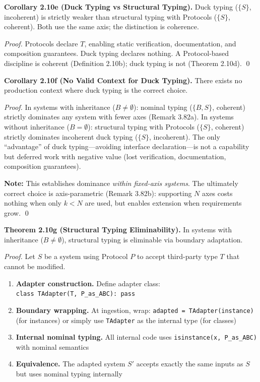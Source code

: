 \textbf{Corollary 2.10e (Duck Typing vs Structural Typing).} Duck typing
(\(\{S\}\), incoherent) is strictly weaker than structural typing with
Protocols (\(\{S\}\), coherent). Both use the same axis; the distinction is coherence.

\emph{Proof.} Protocols declare \(T\), enabling static verification,
documentation, and composition guarantees. Duck typing declares nothing.
A Protocol-based discipline is coherent (Definition 2.10b); duck typing
is not (Theorem 2.10d). \qed

\textbf{Corollary 2.10f (No Valid Context for Duck Typing).} There
exists no production context where duck typing is the correct choice.

\emph{Proof.} In systems with inheritance (\(B \neq \emptyset\)):
nominal typing (\(\{B, S\}\), coherent) strictly dominates any system with fewer axes (Remark 3.82a). In systems without
inheritance (\(B = \emptyset\)): structural typing with Protocols
(\(\{S\}\), coherent) strictly dominates incoherent duck
typing (\(\{S\}\), incoherent). The only ``advantage'' of duck typing---avoiding interface
declaration---is not a capability but deferred work with negative value
(lost verification, documentation, composition guarantees).

\textbf{Note:} This establishes dominance \emph{within fixed-axis systems}. The ultimately correct choice is axis-parametric (Remark 3.82b): supporting $N$ axes costs nothing when only $k < N$ are used, but enables extension when requirements grow.
\qed

\textbf{Theorem 2.10g (Structural Typing Eliminability).} In systems
with inheritance (\(B \neq \emptyset\)), structural typing is eliminable
via boundary adaptation.

\emph{Proof.} Let \(S\) be a system using Protocol \(P\) to accept
third-party type \(T\) that cannot be modified.

\begin{enumerate}
\def\labelenumi{\arabic{enumi}.}
\tightlist
\item
  \textbf{Adapter construction.} Define adapter class:
  \texttt{class\ TAdapter(T,\ P\_as\_ABC):\ pass}
\item
  \textbf{Boundary wrapping.} At ingestion, wrap:
  \texttt{adapted\ =\ TAdapter(instance)} (for instances) or simply use
  \texttt{TAdapter} as the internal type (for classes)
\item
  \textbf{Internal nominal typing.} All internal code uses
  \texttt{isinstance(x,\ P\_as\_ABC)} with nominal semantics
\item
  \textbf{Equivalence.} The adapted system \(S'\) accepts exactly the
  same inputs as \(S\) but uses nominal typing internally
\end{enumerate}

